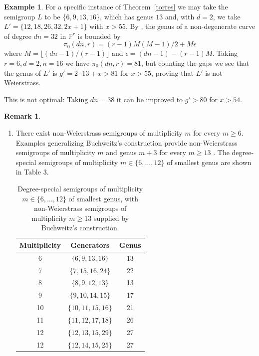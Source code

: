 \documentclass[twoside,12pt, leqno]{amsart}
\theoremstyle{definition}
\newtheorem{remark}[theorem]{Remark}
\newtheorem{example}[theorem]{Example}
\def\PP{{\mathbb P}}
\begin{document}
\begin{example}\label{Torres example} For a specific instance of Theorem~\ref{torres} we may take the semigroup $L$ to be $\{6,9,13,16\}$, which has genus $13$ and, with $d = 2$, we take $L'=\{12,18,26,32, 2x+1\}$ with $x>55$. By \cite[Theorem 10.4]{MR4898511}, 
the genus of a non-degenerate curve of degree $dn=32$
in $\PP^{r}$  is bounded by
 $$\pi_{0}(dn,r)=(r-1)M(M-1)/2+M\epsilon$$
where $M = \lfloor(dn-1)/(r-1)\rfloor$ and $\epsilon = (dn-1) - (r-1)M$. 
Taking $r = 6, d=2, n=16$ we have
$\pi_{0}(dn,r) = 81$, but counting the gaps we see that
the genus of $L'$ is $g'=2\cdot 13+x>81$ for $x > 55$, proving that $L'$ is not Weierstrass.

This is not optimal: Taking $dn = 38$ it can be improved to  $g'> 80$ for $x> 54$.
\end{example}
\begin{remark}
 
\begin{enumerate}
\item There exist non-Weierstrass semigroups of multiplicity $m$ for every $m \ge 6$. Examples generalizing Buchweitz's construction provide non-Weierstrass semigroups of multiplicity $m$ and genus $m+3$ for every $m\ge 13$ \cite[Section 2]{MR1634703}. The degree-special semigroups of multiplicity $m \in \{6,\ldots,12\}$ of smallest genus are shown in Table 3.

\begin{table}[h]\label{table2}
\centering
\begin{tabular}{ccc}
\toprule
Multiplicity & Generators & Genus \\
\midrule
6  & $\{6, 9, 13, 16\}$  & 13 \\
7  & $\{7, 15, 16, 24\}$ & 22 \\
8  & $\{8, 9, 12, 13\}$  & 13 \\
9  & $\{9, 10, 14, 15\}$ & 17 \\
10 & $\{10, 11, 15, 16\}$ & 21 \\
11 & $\{11, 12, 17, 18\}$ & 26 \\
12 & $\{12, 13, 15, 29\}$ & 27 \\
12 & $\{12, 14, 15, 25\}$ & 27 \\
\bottomrule
\end{tabular}
\caption{Degree-special semigroups of multiplicity $m \in \{6, \ldots, 12\}$ 
of smallest genus, with non-Weierstrass semigroups of multiplicity 
$m \geq 13$ supplied by Buchweitz's construction.}
\end{table}


\end{enumerate}
\end{remark}
\end{document}
